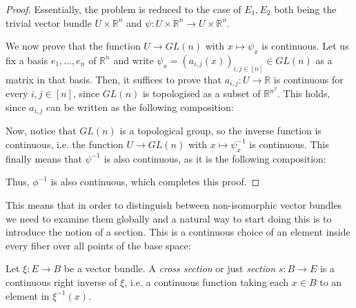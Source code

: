 \begin{proof}
Essentially, the problem is reduced to the case of $E_1,E_2$ both being the trivial vector bundle $U\times\mathbb{R}^n$ and $\psi:U\times\mathbb{R}^n\to U\times\mathbb{R}^n$.

We now prove that the function $U\to GL(n)$ with $x\mapsto\psi_x$ is continuous. Let us fix a basis $e_1,\ldots,e_n$ of $\mathbb{R}^n$ and write $\psi_x=(a_{i,j}(x))_{i,j\in[n]}\in GL(n)$ as a matrix in that basis. Then, it suffices to prove that $a_{i,j}:U\to\mathbb{R}$ is continuous for every $i,j\in[n]$, since $GL(n)$ is topologised as a subset of $\mathbb{R}^{n^2}$. This holds, since $a_{i,j}$ can be written as the following composition:
\begin{center}
\end{center}

Now, notice that $GL(n)$ is a topological group, so the inverse function is continuous, i.e. the function $U\to GL(n)$ with $x\mapsto\psi_x^{-1}$ is continuous. This finally means that $\psi^{-1}$ is also continuous, as it is the following composition:
\begin{center}
\end{center}
Thus, $\phi^{-1}$ is also continuous, which completes this proof.
\end{proof}

This means that in order to distinguish between non-isomorphic vector bundles we need to examine them globally and a natural way to start doing this is to introduce the notion of a section. This is a continuous choice of an element inside every fiber over all points of the base space:

\begin{definition} Let $\xi:E\to B$ be a vector bundle. A \emph{cross section} or just \emph{section} $s:B\to E$ is a continuous right inverse of $\xi$, i.e. a continuous function taking each $x\in B$ to an element in $\xi^{-1}(x)$.
\end{definition}

